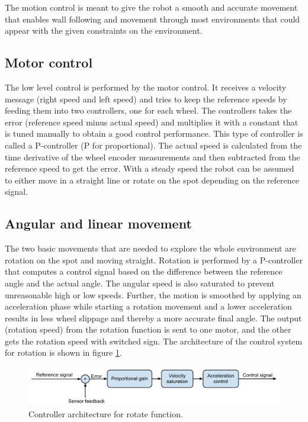 The motion control is meant to give the robot a smooth and accurate movement that enables wall following and movement through most environments that could appear with the given constraints on the environment.

\subsection{Motor control}

The low level control is performed by the motor control. It receives a velocity message (right speed and left speed) and tries to keep the reference speeds by feeding them into two controllers, one for each wheel. The controllers takes the error (reference speed minus actual speed) and multiplies it with a constant that is tuned manually to obtain a good control performance. This type of controller is called a P-controller (P for proportional). The actual speed is calculated from the time derivative of the wheel encoder measurements and then subtracted from the reference speed to get the error.
With a steady speed the robot can be assumed to either move in a straight line or rotate on the spot depending on the reference signal.

\subsection{Angular and linear movement }

The two basic movements that are needed to explore the whole environment are rotation on the spot and moving straight. Rotation is performed by a P-controller that computes a control signal based on the difference between the reference angle and the actual angle. The angular speed is also saturated to prevent unreasonable high or low speeds. Further, the motion is smoothed by applying an acceleration phase while starting a rotation movement and a lower acceleration results in less wheel slippage and thereby a more accurate final angle. The output (rotation speed) from the rotation function is sent to one motor, and the other gets the rotation speed with switched sign. The architecture of the control system for rotation is shown in figure \ref{fig:rotation_blockdiagram}.

\begin{figure}[h]
\label{fig:rotation_blockdiagram}
    \begin{centering}
   	 \includegraphics[scale=0.5]{figures/rotate_blockdiagram.pdf}
   	 \caption{Controller architecture for rotate function.}\label{fig:rotation_blockdiagram}
    \end{centering}
\end{figure}

